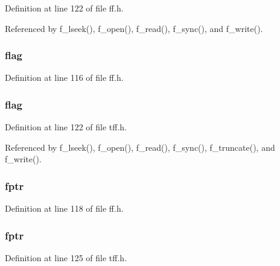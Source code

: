 Definition at line 122 of file ff.\-h.



Referenced by f\-\_\-lseek(), f\-\_\-open(), f\-\_\-read(), f\-\_\-sync(), and f\-\_\-write().

\hypertarget{struct_f_i_l_a4e16a1d9fcd8aef6ceac670d92b91579}{
\subsubsection[{flag}]{ flag}}\label{struct_f_i_l_a4e16a1d9fcd8aef6ceac670d92b91579}


Definition at line 116 of file ff.\-h.

\hypertarget{struct_f_i_l_ae84669505a47c55d6246560a290a298d}{
\subsubsection[{flag}]{ flag}}\label{struct_f_i_l_ae84669505a47c55d6246560a290a298d}


Definition at line 122 of file tff.\-h.



Referenced by f\-\_\-lseek(), f\-\_\-open(), f\-\_\-read(), f\-\_\-sync(), f\-\_\-truncate(), and f\-\_\-write().

\hypertarget{struct_f_i_l_a0f65af32a2d036c560e66177961b9b22}{
\subsubsection[{fptr}]{ fptr}}\label{struct_f_i_l_a0f65af32a2d036c560e66177961b9b22}


Definition at line 118 of file ff.\-h.

\hypertarget{struct_f_i_l_a5afdaf3451d484cc97e07228b775ccf1}{
\subsubsection[{fptr}]{ fptr}}\label{struct_f_i_l_a5afdaf3451d484cc97e07228b775ccf1}


Definition at line 125 of file tff.\-h.



